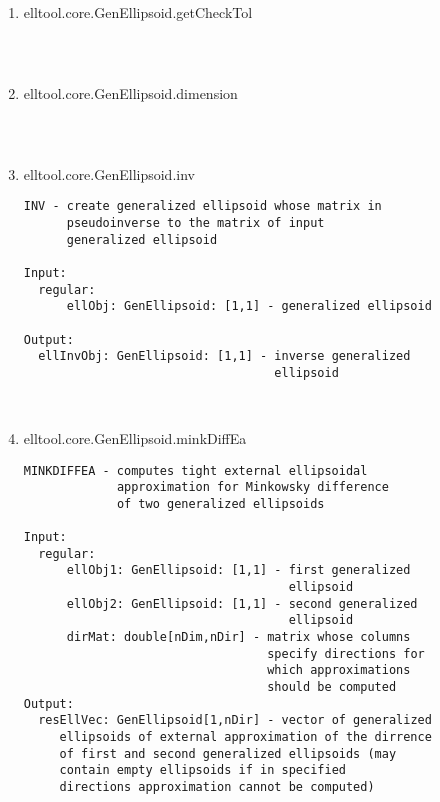 \begin{enumerate}
\begin{lstlisting}
\end{lstlisting}
\fontfamily{\familydefault}
\selectfont
\item {elltool.core.GenEllipsoid.getCheckTol}
\selectfont
\begin{lstlisting}



\end{lstlisting}
\fontfamily{\familydefault}
\selectfont
\item {elltool.core.GenEllipsoid.dimension}
\selectfont
\begin{lstlisting}



\end{lstlisting}
\fontfamily{\familydefault}
\selectfont
\item {elltool.core.GenEllipsoid.inv}
\selectfont
\begin{lstlisting}
INV - create generalized ellipsoid whose matrix in
      pseudoinverse to the matrix of input
      generalized ellipsoid

Input:
  regular:
      ellObj: GenEllipsoid: [1,1] - generalized ellipsoid

Output:
  ellInvObj: GenEllipsoid: [1,1] - inverse generalized
                                   ellipsoid



\end{lstlisting}
\fontfamily{\familydefault}
\selectfont
\item {elltool.core.GenEllipsoid.minkDiffEa}
\selectfont
\begin{lstlisting}
MINKDIFFEA - computes tight external ellipsoidal
             approximation for Minkowsky difference
             of two generalized ellipsoids

Input:
  regular:
      ellObj1: GenEllipsoid: [1,1] - first generalized
                                     ellipsoid
      ellObj2: GenEllipsoid: [1,1] - second generalized
                                     ellipsoid
      dirMat: double[nDim,nDir] - matrix whose columns
                                  specify directions for
                                  which approximations
                                  should be computed
Output:
  resEllVec: GenEllipsoid[1,nDir] - vector of generalized
     ellipsoids of external approximation of the dirrence
     of first and second generalized ellipsoids (may
     contain empty ellipsoids if in specified
     directions approximation cannot be computed)







\end{lstlisting}
\end{enumerate}
